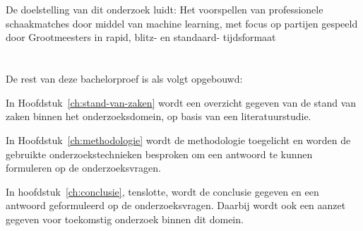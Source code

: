 \section{}%
\label{sec:onderzoeksdoelstelling}

De doelstelling van dit onderzoek luidt: Het voorspellen van professionele schaakmatches door middel van machine learning, met focus op partijen gespeeld door Grootmeesters in rapid, blitz- en standaard- tijdsformaat


\section{}%
\label{sec:opzet-bachelorproef}


De rest van deze bachelorproef is als volgt opgebouwd:

In Hoofdstuk~\ref{ch:stand-van-zaken} wordt een overzicht gegeven van de stand van zaken binnen het onderzoeksdomein, op basis van een literatuurstudie.

In Hoofdstuk~\ref{ch:methodologie} wordt de methodologie toegelicht en worden de gebruikte onderzoekstechnieken besproken om een antwoord te kunnen formuleren op de onderzoeksvragen.


In hoofdstuk~\ref{ch:conclusie}, tenslotte, wordt de conclusie gegeven en een antwoord geformuleerd op de onderzoeksvragen. Daarbij wordt ook een aanzet gegeven voor toekomstig onderzoek binnen dit domein.